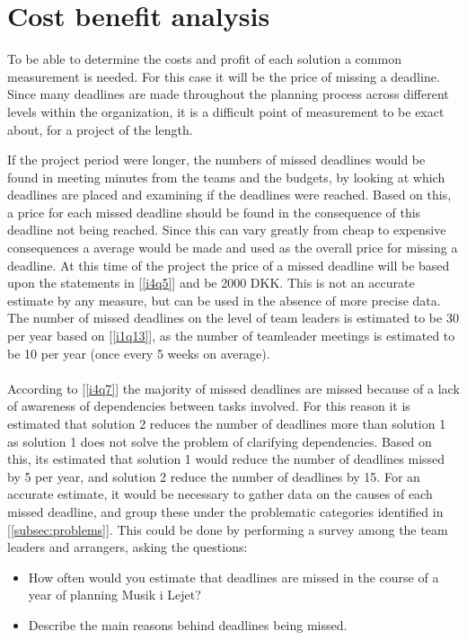 \section{Cost benefit analysis} %
\label{sec:cost_benefit_analysis}
To be able to determine the costs and profit of each solution a common measurement is needed. For this case it will be the price of missing a deadline. Since many deadlines are made throughout the planning process across different levels within the organization, it is a difficult point of measurement to be exact about, for a project of the length.

If the project period were longer, the numbers of missed deadlines would be found in meeting minutes from the teams and the budgets, by looking at which deadlines are placed and examining if the deadlines were reached. Based on this, a price for each missed deadline should be found in the consequence of this deadline not being reached. Since this can vary greatly from cheap to expensive consequences a average would be made and used as the overall price for missing a deadline. At this time of the project the price of a missed deadline will be based upon the statements in [\ref{i4q5}] and be 2000 DKK. This is not an accurate estimate by any measure, but can be used in the absence of more precise data. The number of missed deadlines on the level of team leaders is estimated to be 30 per year based on [\ref{i1q13}], as the number of teamleader meetings is estimated to be 10 per year (once every 5 weeks on average).
\\ \\
According to [\ref{i4q7}] the majority of missed deadlines are missed because of a lack of awareness of dependencies between tasks involved. For this reason it is estimated that solution 2 reduces the number of deadlines more than solution 1 as solution 1 does not solve the problem of clarifying dependencies. Based on this, its estimated that solution 1 would reduce the number of deadlines missed by 5 per year, and solution 2 reduce the number of deadlines by 15. For an accurate estimate, it would be necessary to gather data on the causes of each missed deadline, and group these under the problematic categories identified in [\ref{subsec:problems]}. This could be done by performing a survey among the team leaders and arrangers, asking the questions:
\begin{itemize}
\item How often would you estimate that deadlines are missed in the course of a year of planning Musik i Lejet?
\item Describe the main reasons behind deadlines being missed.
\end{itemize}
